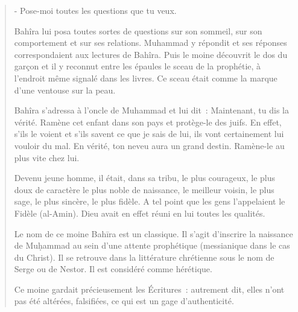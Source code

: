 \begin{quotation}
- Pose-moi toutes les questions que tu veux.

Bahîra lui posa toutes sortes de questions sur son sommeil, sur son
comportement et sur ses relations. Muhammad y répondit et ses réponses
correspondaient aux lectures de Bahîra. Puis le moine découvrit le dos
du garçon et il y reconnut entre les épaules le sceau de la prophétie, à
l'endroit même signalé dans les livres. Ce sceau était comme la marque
d'une ventouse sur la peau.

Bahîra s'adressa à l'oncle de Muhammad et lui dit~: Maintenant, tu dis
la vérité. Ramène cet enfant dans son pays et protège-le des juifs. En
effet, s'ils le voient et s'ils savent ce que je sais de lui, ils vont
certainement lui vouloir du mal. En vérité, ton neveu aura un grand
destin. Ramène-le au plus vite chez lui.

Devenu jeune homme, il était, dans sa tribu, le plus courageux, le plus
doux de caractère le plus noble de naissance, le meilleur voisin, le
plus sage, le plus sincère, le plus fidèle. A tel point que les gens
l'appelaient le Fidèle (al-Amin). Dieu avait en effet réuni en lui
toutes les qualités.

Le nom de ce moine Bahīra est un classique. Il s'agit d'inscrire la
naissance de Muḥammad au sein d'une attente prophétique (messianique
dans le cas du Christ). Il se retrouve dans la littérature chrétienne
sous le nom de Serge ou de Nestor. Il est considéré comme hérétique.

Ce moine gardait précieusement les Écritures~: autrement dit, elles
n'ont pas été altérées, falsifiées, ce qui est un gage d'authenticité.
\end{quotation}

